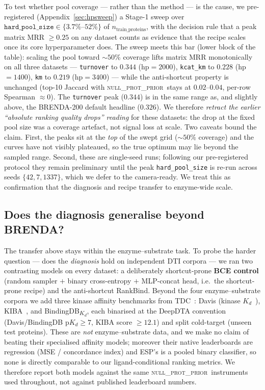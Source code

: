 \documentclass[11pt,a4paper]{article}
\newcommand{\method}{RankBind\xspace}
\newcommand{\nullprior}{\textsc{null\_prot\_prior}\xspace}
\begin{document}
To test whether pool coverage --- rather than the method --- is the
cause, we pre-registered (Appendix~\ref{sec:hpsweep}) a Stage-1 sweep
over $\texttt{hard\_pool\_size} \in \{3.7\%\text{--}52\%\}$ of
$n_{\text{train\_proteins}}$, with the decision rule that a peak matrix
MRR $\ge 0.25$ on any dataset counts as evidence that the recipe scales
once its core hyperparameter does. The sweep meets this bar (lower
block of the table): scaling the pool toward $\sim\!50\%$ coverage
lifts matrix MRR monotonically on all three datasets --- \texttt{turnover}
to $\mathbf{0.344}$ (hp$=2000$), \texttt{kcat\_km} to $\mathbf{0.228}$
(hp$=1400$), \texttt{km} to $\mathbf{0.219}$ (hp$=3400$) --- while the
anti-shortcut property is unchanged (top-10 Jaccard with \nullprior\
stays at $0.02$--$0.04$, per-row Spearman $\approx 0$). The
\texttt{turnover} peak ($0.344$) is in the same range as, and slightly
above, the BRENDA-200 default headline ($0.326$). We therefore
\emph{retract the earlier ``absolute ranking quality drops'' reading}
for these datasets: the drop at the fixed pool size was a
coverage artefact, not signal loss at scale. Two caveats bound the
claim. First, the peaks sit at the \emph{top} of the swept grid
($\sim\!50\%$ coverage) and the curves have not visibly plateaued, so
the true optimum may lie beyond the sampled range. Second, these are
single-seed runs; following our pre-registered protocol they remain
preliminary until the peak \texttt{hard\_pool\_size} is re-run across
seeds $\{42, 7, 1337\}$, which we defer to the camera-ready. We treat
this as confirmation that the diagnosis and recipe transfer to
enzyme-wide scale.

\subsection{Does the diagnosis generalise beyond BRENDA?}
\label{sec:generalise}

The transfer above stays within the enzyme--substrate task. To probe
the harder question --- does the \emph{diagnosis} hold on independent
DTI corpora --- we ran two contrasting models on every dataset: a
deliberately shortcut-prone \textbf{BCE control} (random sampler $+$
binary cross-entropy $+$ MLP-concat head, i.e.\ the shortcut-prone recipe) and
the anti-shortcut \method. Beyond the four enzyme--substrate corpora we
add three kinase affinity benchmarks from TDC~\citep{huang2021tdc}:
Davis (kinase $K_d$~\citep{davis2011kinase}),
KIBA~\citep{tang2014kiba}, and BindingDB\textsubscript{$K_d$}, each
binarised at the DeepDTA convention~\citep{ozturk2018deepdta}
(Davis/BindingDB $\text{p}K_d \ge 7$, KIBA score $\ge 12.1$) and split
cold-target (unseen test proteins). These are \emph{not}
enzyme--substrate data, and we make no claim of beating their
specialised affinity models; moreover their native leaderboards are
regression (MSE / concordance index) and ESP's is a pooled binary
classifier, so none is directly comparable to our ligand-conditional
ranking metrics. We therefore report both models against the same
\nullprior\ instruments used throughout, not against published
leaderboard numbers.
\end{document}
